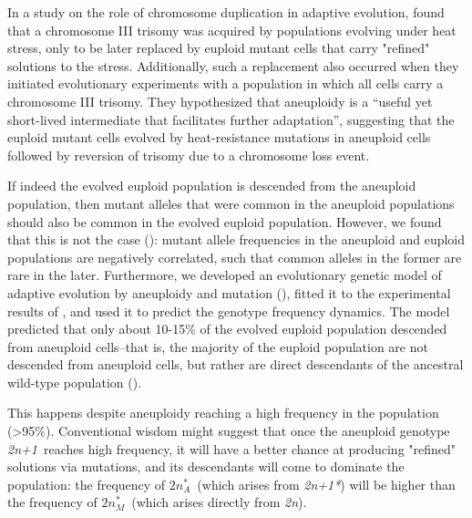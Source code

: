 \documentclass[12pt]{extarticle}
\newcommand{\euwt}{\emph{2n}}
\newcommand{\anwt}{\emph{2n+1}}
\newcommand{\eumtM}{\emph{$2n^*_M$}}
\newcommand{\eumtA}{\emph{$2n^*_A$}}
\newcommand{\anmt}{\emph{2n+1*}}
\begin{document}
In a study on the role of chromosome duplication in adaptive evolution, 
\citet{Yona2012} found that a chromosome III trisomy was acquired by \yeast populations evolving under heat stress, only to be later replaced by euploid mutant cells that carry "refined" solutions to the stress. 
Additionally, such a replacement also occurred when they initiated evolutionary experiments with a population in which all cells carry a chromosome III trisomy.
They hypothesized that aneuploidy is a ``useful yet short-lived intermediate that facilitates further adaptation'', suggesting that the euploid mutant cells evolved by heat-resistance mutations in aneuploid cells followed by reversion of trisomy due to a chromosome loss event. 

If indeed the evolved euploid population is descended from the aneuploid population, then mutant alleles that were common in the aneuploid populations should also be common in the evolved euploid population.
However, we found that this is not the case (): mutant allele frequencies in the aneuploid and euploid populations are negatively correlated, such that common alleles in the former are rare in the later. 
Furthermore, we developed an evolutionary genetic model of adaptive evolution by aneuploidy and mutation (), fitted it to the experimental results of \citet{Yona2012}, and used it to predict the genotype frequency dynamics.
The model predicted that only about 10-15\% of the evolved euploid population descended from aneuploid cells--that is, the majority of the euploid population are not descended from aneuploid cells, but rather are direct descendants of the ancestral wild-type population ().

This happens despite aneuploidy reaching a high frequency in the population (>95\%). 
Conventional wisdom might suggest that once the aneuploid genotype \anwt\ reaches high frequency, it will have a better chance at producing "refined" solutions via mutations, and its descendants will come to dominate the population: the frequency of \eumtA\ (which arises from \anmt) will be higher than the frequency of \eumtM\ (which arises directly from \euwt).
\end{document}
